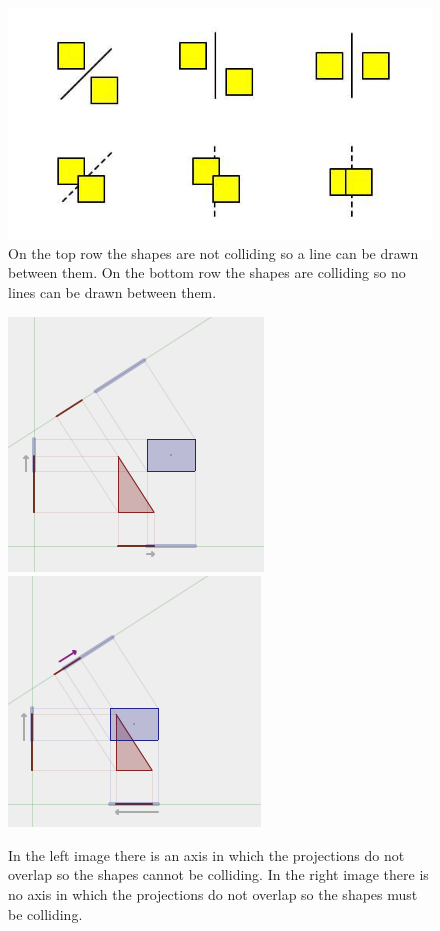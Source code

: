 \documentclass[]{report}
\begin{document}
			\begin{figure}[H]
				\centering
				\includegraphics[scale=0.65]{satlines}
				\caption{On the top row the shapes are not colliding so a line can be drawn between them. On the bottom row the shapes are colliding so no lines can be drawn between them. \cite{sattutorial}}
				\label{satlines}
			\end{figure}
			
			\begin{figure}[H]
				\centering
				\includegraphics[scale=0.65]{nsatprojnocollide}
				\includegraphics[scale=0.66]{nsatprojcollide}
				\caption{In the left image there is an axis in which the projections do not overlap so the shapes cannot be colliding. In the right image there is no axis in which the projections do not overlap so the shapes must be colliding. \cite{nsattutorial}}
				\label{nsatprojections}
			\end{figure}
			
\end{document}
